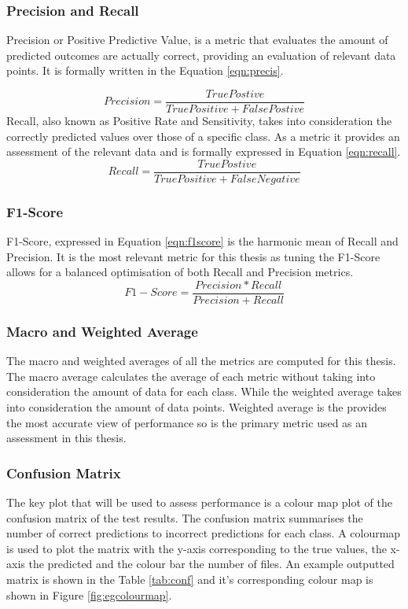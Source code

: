\subsubsection{Precision and Recall}

Precision or Positive Predictive Value, is a metric that evaluates the amount of predicted outcomes are actually correct, providing 
an evaluation of relevant data  points. It is formally written in the Equation \ref{eqn:precis}. 

\begin{equation}
    \label{eqn:precis}
    Precision =\frac{TruePostive}{TruePositive + FalsePostive}
\end{equation}
Recall, also known as Positive Rate and Sensitivity, takes into consideration 
the correctly predicted values over those of a specific class. As a metric it provides an assessment of the relevant 
data and is formally expressed in Equation \ref{eqn:recall}. 
\begin{equation}
    \label{eqn:recall}
    Recall =\frac{TruePostive}{TruePositive + FalseNegative}
\end{equation}

\subsubsection{F1-Score}
F1-Score, expressed in Equation \ref{eqn:f1score} is the harmonic mean of Recall and Precision. It is the most relevant metric for this thesis as 
tuning the F1-Score allows for a balanced optimisation of both Recall and Precision metrics. 
\begin{equation}    
    \label{eqn:f1score}
    F1-Score =\frac{Precision*Recall}{Precision + Recall}
\end{equation}
\subsubsection{Macro and Weighted Average}
The macro and weighted averages of all the metrics are computed for this thesis. The macro average calculates the average of each metric without 
taking into consideration the amount of data for each class. While the weighted average takes into consideration the amount of data points. Weighted average 
is the provides the most accurate view of performance so is the primary metric used as an assessment in this thesis.  
\subsubsection{Confusion Matrix}
The key plot that will be used to assess performance is a colour map plot of the confusion matrix of the test results.
The confusion matrix summarises the number of correct predictions to incorrect predictions for each class. A colourmap is used to plot the matrix 
with the y-axis corresponding to the true values, the x-axis the predicted and the colour bar the number of files. 
An example outputted matrix is shown in the Table \ref{tab:conf} and it's corresponding colour map is shown in Figure \ref{fig:egcolourmap}. 


